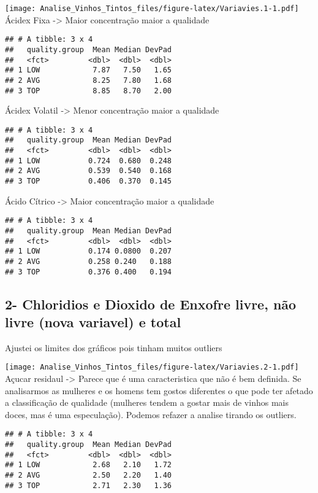 \documentclass[]{article}
\begin{document}
\texttt{[image: Analise\_Vinhos\_Tintos\_files/figure-latex/Variavies.1-1.pdf]}
Ácidex Fixa -\textgreater{} Maior concentração maior a qualidade

\begin{verbatim}
## # A tibble: 3 x 4
##   quality.group  Mean Median DevPad
##   <fct>         <dbl>  <dbl>  <dbl>
## 1 LOW            7.87   7.50   1.65
## 2 AVG            8.25   7.80   1.68
## 3 TOP            8.85   8.70   2.00
\end{verbatim}

Ácidex Volatil -\textgreater{} Menor concentração maior a qualidade

\begin{verbatim}
## # A tibble: 3 x 4
##   quality.group  Mean Median DevPad
##   <fct>         <dbl>  <dbl>  <dbl>
## 1 LOW           0.724  0.680  0.248
## 2 AVG           0.539  0.540  0.168
## 3 TOP           0.406  0.370  0.145
\end{verbatim}

Ácido Cítrico -\textgreater{} Maior concentração maior a qualidade

\begin{verbatim}
## # A tibble: 3 x 4
##   quality.group  Mean Median DevPad
##   <fct>         <dbl>  <dbl>  <dbl>
## 1 LOW           0.174 0.0800  0.207
## 2 AVG           0.258 0.240   0.188
## 3 TOP           0.376 0.400   0.194
\end{verbatim}

\hypertarget{chloridios-e-dioxido-de-enxofre-livre-nao-livre-nova-variavel-e-total}{%
\subsection{2- Chloridios e Dioxido de Enxofre livre, não livre (nova
variavel) e
total}\label{chloridios-e-dioxido-de-enxofre-livre-nao-livre-nova-variavel-e-total}}

Ajustei os limites dos gráficos pois tinham muitos outliers

\texttt{[image: Analise\_Vinhos\_Tintos\_files/figure-latex/Variavies.2-1.pdf]}
Açucar residaul -\textgreater{} Parece que é uma caracteristica que não
é bem definida. Se analisarmos as mulheres e os homens tem gostos
diferentes o que pode ter afetado a classificação de qualidade (mulheres
tendem a gostar mais de vinhos mais doces, mas é uma especulação).
Podemos refazer a analise tirando os outliers.

\begin{verbatim}
## # A tibble: 3 x 4
##   quality.group  Mean Median DevPad
##   <fct>         <dbl>  <dbl>  <dbl>
## 1 LOW            2.68   2.10   1.72
## 2 AVG            2.50   2.20   1.40
## 3 TOP            2.71   2.30   1.36
\end{verbatim}
\end{document}
